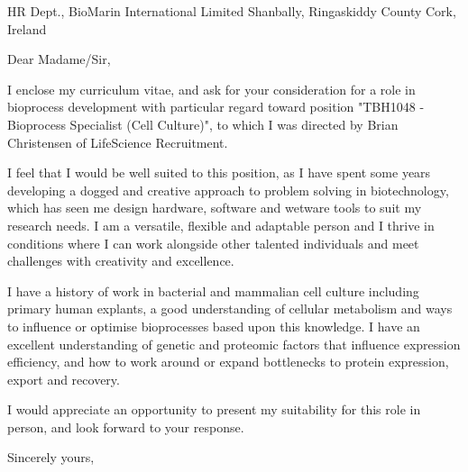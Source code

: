 \documentclass{scrlttr2}
\renewcommand{\\}{\ {\large\textperiodcentered}\ }
\begin{document}

\begin{letter}{ %
HR Dept., BioMarin International Limited
Shanbally, Ringaskiddy
County Cork, Ireland
}

\opening{Dear Madame/Sir,}

I enclose my curriculum vitae, and ask for your consideration for a role in bioprocess development with particular regard toward  position "TBH1048 - Bioprocess Specialist (Cell Culture)", to which I was directed by Brian Christensen of LifeScience Recruitment.\\

I feel that I would be well suited to this position, as I have spent some years developing a dogged and creative approach to problem solving in biotechnology, which has seen me design hardware, software and wetware tools to suit my research needs. I am a versatile, flexible and adaptable person and I thrive in conditions where I can work alongside other talented individuals and meet challenges with creativity and excellence.\\

I have a history of work in bacterial and mammalian cell culture including primary human explants, a good understanding of cellular metabolism and ways to influence or optimise bioprocesses based upon this knowledge. I have an excellent understanding of genetic and proteomic factors that influence expression efficiency, and how to work around or expand bottlenecks to protein expression, export and recovery.\\

I would appreciate an opportunity to present my suitability for this role in person, and look forward to your response.\\

Sincerely yours, \\ \\ \\


\end{letter}
\end{document}

